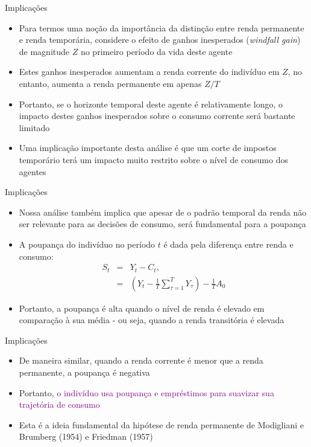 \documentclass[10pt]{beamer}
\begin{document}
\begin{frame}{Implicações}
    \begin{itemize}
        \item Para termos uma noção da importância da distinção entre renda permanente e renda temporária, considere o efeito de ganhos inesperados (\emph{windfall gain}) de magnitude $Z$ no primeiro período da vida deste agente
        \bigskip
        \item Estes ganhos inesperados aumentam a renda corrente do indivíduo em $Z$, no entanto, aumenta a renda permanente em apenas $Z/T$
        \bigskip
        \item Portanto, se o horizonte temporal deste agente é relativamente longo, o impacto destes ganhos inesperados sobre o consumo corrente será bastante limitado
        \bigskip
        \item Uma implicação importante desta análise é que um corte de impostos temporário terá um impacto muito restrito sobre o nível de consumo dos agentes
    \end{itemize}
\end{frame}

\begin{frame}{Implicações}
    \begin{itemize}
        \item Nossa análise também implica que apesar de o padrão temporal da renda não ser relevante para as decisões de consumo, será fundamental para a poupança
        \bigskip
        \item A poupança do indivíduo no período $t$ é dada pela diferença entre renda e consumo:
        \begin{eqnarray}
            S_t &=& Y_t - C_t, \nonumber \\
            &=& \left(Y_t - \frac{1}{T}\sum_{\tau=1}^T Y_\tau\right) - \frac{1}{T}A_0 \label{eq7}
        \end{eqnarray}
        \bigskip
        \item Portanto, a poupança é alta quando o nível de renda é elevado em comparação à sua média - ou seja, quando a renda transitória é elevada
    \end{itemize}
\end{frame}

\begin{frame}{Implicações}
    \begin{itemize}
        \item De maneira similar, quando a renda corrente é menor que a renda permanente, a poupança é negativa
        \bigskip
        \item Portanto, \textcolor{purple}{o indivíduo usa poupança e empréstimos para suavizar sua trajetória de consumo}
        \bigskip
        \item Esta é a ideia fundamental da hipótese de renda permanente de Modigliani e Brumberg (1954) e Friedman (1957)
    \end{itemize}
\end{frame}
\end{document}
